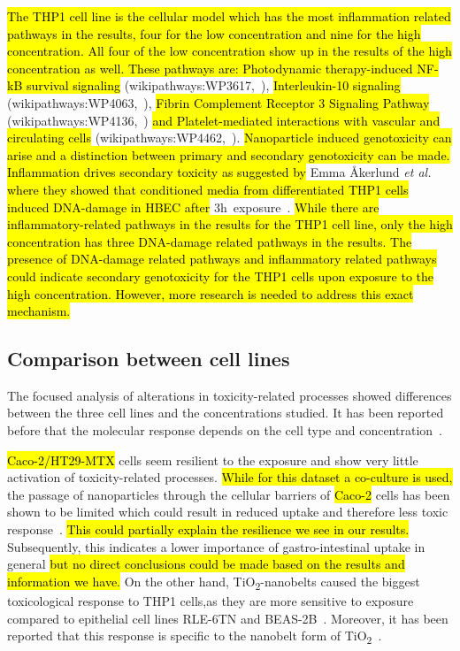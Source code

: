 \documentclass[ijms,article,submit,moreauthors,pdftex]{Definitions/mdpi}
\begin{document}
\hl{The THP1 cell line is the cellular model which has the most inflammation related pathways in the results, four for the low concentration and nine for the high concentration. All four of the low concentration show up in the results of the high concentration as well. These pathways are: Photodynamic therapy-induced NF-kB survival signaling} (wikipathways:WP3617,~\cite{WP3617}), \hl{Interleukin-10 signaling} (wikipathways:WP4063,~\cite{WP4063}), \hl{Fibrin Complement Receptor 3 Signaling Pathway} (wikipathways:WP4136,~\cite{WP4136}) \hl{and Platelet-mediated interactions with vascular and circulating cells} (wikipathways:WP4462,~\cite{WP4462}).
\hl{Nanoparticle induced genotoxicity can arise and a distinction between primary and secondary genotoxicity can be made. Inflammation drives secondary toxicity as suggested by} Emma Åkerlund \textit{et al.} \hl{where they showed that conditioned media from differentiated THP1 cells induced DNA-damage in HBEC after} 3h~exposure~\cite{Akerlund2019}. \hl{While there are inflammatory-related pathways in the results for the THP1 cell line, only the high concentration has three DNA-damage related pathways in the results. The presence of DNA-damage related pathways and inflammatory related pathways could indicate secondary genotoxicity for the THP1 cells upon exposure to the high concentration. However, more research is needed to address this exact mechanism.} 

\subsection*{Comparison between cell lines}
The focused analysis of alterations in toxicity-related processes showed differences between the three cell lines and the concentrations studied. It has been reported before that the molecular response depends on the cell type and concentration~\cite{TadaOikawa2016}. 

\hl{Caco-2/HT29-MTX} cells seem resilient to the exposure and show very little activation of toxicity-related processes. \hl{While for this dataset a co-culture is used,} the passage of nanoparticles through the cellular barriers of \hl{Caco-2} cells has been shown to be limited which could result in reduced uptake and therefore less toxic response~\cite{Ye2017}. \hl{This could partially explain the resilience we see in our results.} Subsequently, this indicates a lower importance of gastro-intestinal uptake in general \hl{but no direct conclusions could be made based on the results and information we have.} On the other hand, TiO\textsubscript{2}-nanobelts caused the biggest toxicological response to THP1 cells,as they are more sensitive to exposure compared to epithelial cell lines RLE-6TN and BEAS-2B~\cite{Xia2013}. Moreover, it has been reported that this response is specific to the nanobelt form of TiO\textsubscript{2}~\cite{Xia2013}.
\end{document}

